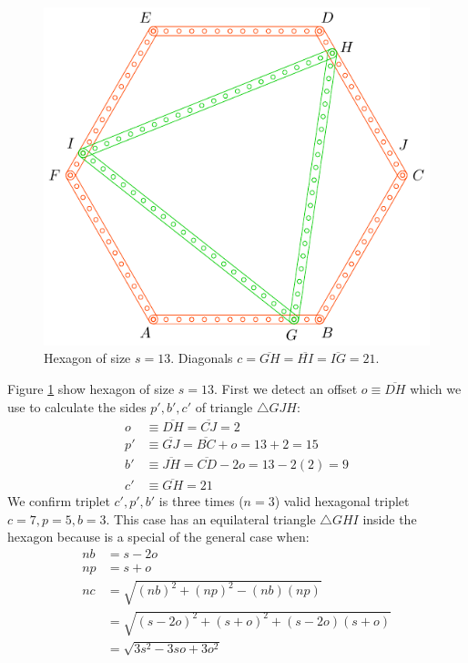 \documentclass[11pt]{article}
\begin{document}
\begin{figure}[H]
\centering
\includegraphics[scale=1]{13/hexa-13a}
\caption{Hexagon of size $s = 13$. Diagonals $c = \overline{GH} = \overline{HI} = \overline{IG} = 21$.}
\label{fig:13a}
\end{figure}

Figure \ref{fig:13a} show hexagon of size $s = 13$. First we detect an offset $o \equiv \overline{DH}$ which we use to calculate the sides $p',b',c'$ of triangle $\triangle{GJH}$:
\begin{align}
o &\equiv \overline{DH} = \overline{CJ} = 2 \nonumber\\
p' &\equiv \overline{GJ} = \overline{BC} + o = 13+2 = 15 \nonumber\\
b' &\equiv \overline{JH} = \overline{CD} - 2o = 13 - 2(2) = 9 \nonumber\\
c' &\equiv \overline{GH} = 21
\end{align}
We confirm triplet $c',p',b'$ is three times ($n=3$) valid hexagonal triplet $c=7,p=5,b=3$.
This case has an equilateral triangle $\triangle{GHI}$ inside the hexagon because is a special of the general case when:
\begin{align}
nb &= s - 2o \nonumber\\
np &= s + o \nonumber\\
nc &= \sqrt{(nb)^2 + (np)^2 - (nb)(np)} \nonumber\\
   &= \sqrt{(s - 2o)^2 + (s+o)^2 + (s - 2o)(s+o)} \nonumber\\
   &= \sqrt{3s^2 - 3so + 3o^2}
\end{align}
\end{document}
